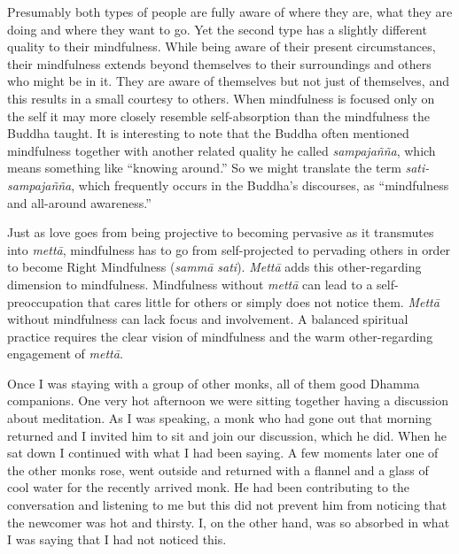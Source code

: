 \documentclass[10pt, openright]{book}
\begin{document}
Presumably both types of people are fully aware of where they are, what they are doing and where they want to go. Yet the second type has a slightly different quality to their mindfulness. While being aware of their present circumstances, their mindfulness extends beyond themselves to their surroundings and others who might be in it. They are aware of themselves but not just of themselves, and this results in a small courtesy to others. When mindfulness is focused only on the self it may more closely resemble self-absorption than the mindfulness the Buddha taught. It is interesting to note that the Buddha often mentioned mindfulness together with another related quality he called \textit{sampajañña}, which means something like “knowing around.” So we might translate the term \textit{sati-sampajañña}, which frequently occurs in the Buddha’s discourses, as “mindfulness and all-around awareness.”


Just as love goes from being projective to becoming pervasive as it transmutes into \textit{mettā}, mindfulness has to go from self-projected to pervading others in order to become Right Mindfulness (\textit{sammā sati}). \textit{Mettā} adds this other-regarding dimension to mindfulness. Mindfulness without \textit{mettā} can lead to a self-preoccupation that cares little for others or simply does not notice them. \textit{Mettā} without mindfulness can lack focus and involvement. A balanced spiritual practice requires the clear vision of mindfulness and the warm other-regarding engagement of \textit{mettā}.


Once I was staying with a group of other monks, all of them good Dhamma companions. One very hot afternoon we were sitting together having a discussion about meditation. As I was speaking, a monk who had gone out that morning returned and I invited him to sit and join our discussion, which he did. When he sat down I continued with what I had been saying. A few moments later one of the other monks rose, went outside and returned with a flannel and a glass of cool water for the recently arrived monk. He had been contributing to the conversation and listening to me but this did not prevent him from noticing that the newcomer was hot and thirsty. I, on the other hand, was so absorbed in what I was saying that I had not noticed this.
\end{document}
